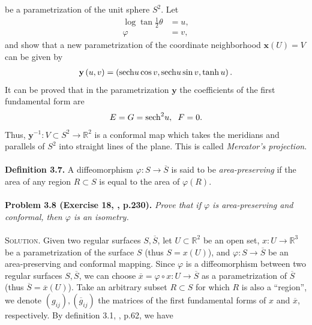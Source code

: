 \documentclass[a4paper]{article}
\numberwithin{equation}{section}
\begin{document}
be a parametrization of the unit sphere $S^2$. Let
\begin{align}
\log \tan \frac{1}{2}\theta  &= u,\\
\varphi  &= v,
\end{align}
and show that a new parametrization of the coordinate neighborhood $\mathbf{x}\left(U\right)=V$ can be given by
\begin{align}
\mathbf{y}\left( {u,v} \right) = \left( {{\mathop{\rm sech}\nolimits} u\cos v,{\mathop{\rm sech}\nolimits} u\sin v,\tanh u} \right).
\end{align}
It can be proved that in the parametrization $\mathbf{y}$ the coefficients of the first fundamental form are
\begin{align}
E = G = {{\mathop{\rm sech}\nolimits} ^2}u,\hspace{0.2cm} F = 0.
\end{align}
Thus, ${\mathbf{y}^{ - 1}}:V \subset {S^2} \to {\mathbb{R}^2}$ is a conformal map which takes the meridians and parallels of $S^2$ into straight lines of the plane. This is called \textit{Mercator's projection}.\\
\\
\textbf{Definition 3.7.} A diffeomorphism $\varphi :S\to \overline{S}$ is said to be \textit{area-preserving} if the area of any region $R\subset S$ is equal to the area of $\varphi \left(R\right)$.\\
\\
\textbf{Problem 3.8 (Exercise 18, \cite{2}, p.230).} \textit{Prove that if $\varphi$ is area-preserving and conformal, then $\varphi$ is an isometry.}\\
\\
\textsc{Solution.} Given two regular surfaces $S,\overline{S}$, let $U\subset \mathbb{R}^2$ be an open set, $x:U\to \mathbb{R}^3$ be a parametrization of the surface $S$ (thus $S=x\left(U\right)$), and $\varphi :S\to \overline{S}$ be an area-preserving and conformal mapping. Since $\varphi$ is a diffeomorphism between two regular surfaces $S,\overline{S}$, we can choose $\overline x  = \varphi  \circ x:U \to \overline S $ as a parametrization of $\overline{S}$ (thus $\overline{S}=\overline{x}\left(U\right)$). Take an arbitrary subset $R\subset S$ for which $R$ is also a ``region'', we denote $\left( {{g_{ij}}} \right),\left( {{{\overline g }_{ij}}} \right)$ the matrices of the first fundamental forms of $x$ and $\overline{x}$, respectively. By definition 3.1, \cite{1}, p.62, we have
\end{document}
